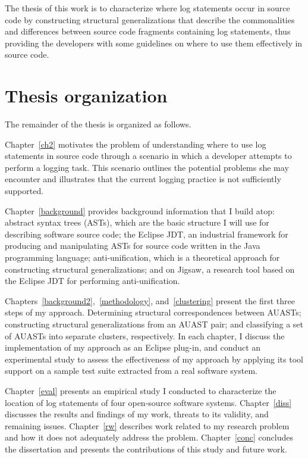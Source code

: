 The thesis of this work is to characterize where log statements occur in source code by constructing structural generalizations that describe the commonalities and differences between source code fragments containing log statements, thus providing the developers with some guidelines on where to use them effectively in source code. 

\section{Thesis organization} \label{intro-org}
The remainder of the thesis is organized as follows.

Chapter~\ref{ch2} motivates the problem of understanding where to use log statements in source code through a scenario in which a developer attempts to perform a logging task. This scenario outlines the potential problems she may encounter and illustrates that the current logging practice is not sufficiently supported.

Chapter~\ref{background} provides background information that I build atop: abstract syntax trees (ASTs), which are the basic structure I will use for describing software source code; the Eclipse JDT, an industrial framework for producing and manipulating ASTs for source code written in the Java programming language; anti-unification, which is a theoretical approach for constructing structural generalizations; and on Jigsaw, a research tool based on the Eclipse JDT for performing anti-unification.


Chapters~\ref{background2},~\ref{methodology}, and~\ref{clustering} present the first three steps of my approach. Determining structural correspondences between AUASTs; constructing structural generalizations from an AUAST pair; and classifying a set of AUASTs into separate clusters, respectively. In each chapter, I discuss the implementation of my approach as an Eclipse plug-in, and conduct an experimental study to assess the effectiveness of my approach by applying its tool support on a sample test suite extracted from a real software system.



Chapter~\ref{eval} presents an empirical study I conducted to characterize the location of log statements of four open-source software systems. Chapter~\ref{diss} discusses the results and findings of my work, threats to its validity, and remaining issues. Chapter~\ref{rw} describes work related to my research problem and how it does not adequately address the problem. Chapter~\ref{conc} concludes the dissertation and presents the contributions of this study and future work. %



